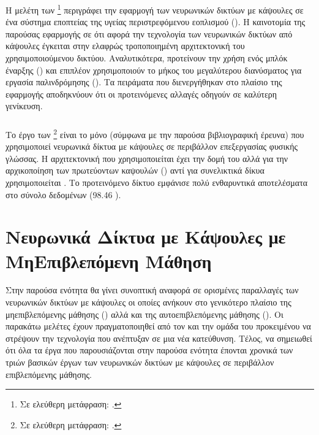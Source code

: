 Η μελέτη των  \footnote{Σε ελεύθερη μετάφραση: .} \cite{zhu2019convolutional} περιγράφει την εφαρμογή των νευρωνικών δικτύων με κάψουλες σε ένα σύστημα εποπτείας της υγείας περιστρεφόμενου εοπλισμού (). Η καινοτομία της παρούσας εφαρμογής σε ότι αφορά την τεχνολογία των νευρωνικών δικτύων από κάψουλες έγκειται στην ελαφρώς τροποποιημένη αρχιτεκτονική του χρησιμοποιούμενου δικτύου. Αναλυτικότερα, προτείνουν την χρήση ενός μπλόκ έναρξης () και επιπλέον χρησιμοποιούν το μήκος του μεγαλύτερου διανύσματος για εργασία παλινδρόμησης (). Τα πειράματα που διενεργήθηκαν στο πλαίσιο της εφαρμογής αποδηκνύουν ότι οι προτεινόμενες αλλαγές οδηγούν σε καλύτερη γενίκευση.


\subsubsection{}

Το έργο των  \footnote{Σε ελεύθερη μετάφραση: .} \cite{srivastava2018identifying} είναι το μόνο (σύμφωνα με την παρούσα βιβλιογραφική έρευνα) που χρησιμοποιεί νευρωνικά δίκτυα με κάψουλες σε περιβάλλον επεξεργασίας φυσικής γλώσσας. Η αρχιτεκτονική που χρησιμοποιείται έχει την δομή του \cite{sabour2017dynamic} αλλά για την αρχικοποίηση των πρωτεύοντων καψουλών () αντί για συνελικτικά δίκυα χρησιμοποιείται . Το προτεινόμενο δίκτυο εμφάνισε πολύ ενθαρυντικά αποτελέσματα στο σύνολο δεδομένων  (98.46 ).


\section{Νευρωνικά Δίκτυα με Κάψουλες με Μη\textendash Επιβλεπόμενη Μάθηση}

Στην παρούσα ενότητα θα γίνει συνοπτική αναφορά σε ορισμένες παραλλαγές των νευρωνικών δικτύων με κάψουλες οι οποίες ανήκουν στο γενικότερο πλαίσιο της μη\textendash επιβλεπόμενης μάθησης () αλλά και της αυτο\textendash επιβλεπόμενης μάθησης (). Οι παρακάτω μελέτες έχουν πραγματοποιηθεί από τον  και την ομάδα του προκειμένου να στρέψουν την τεχνολογία που ανέπτυξαν σε μια νέα κατεύθυνση. Τέλος, να σημειωθεί ότι όλα τα έργα που παρουσιάζονται στην παρούσα ενότητα έπονται χρονικά των τριών βασικών έργων των νευρωνικών δικτύων με κάψουλες σε περιβάλλον επιβλεπόμενης μάθησης.

